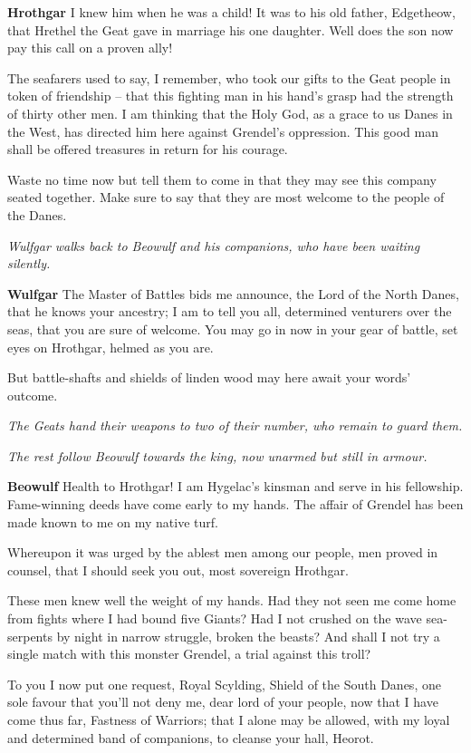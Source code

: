 \documentclass[a4paper]{article}
\begin{document}
{\textbf{Hrothgar} I knew him when he was a child!
It was to his old father, Edgetheow, that
Hrethel the Geat gave in marriage
his one daughter. Well does the son
now pay this call on a proven ally!

The seafarers used to say, I remember,
who took our gifts to the Geat people
in token of friendship – that this fighting man
in his hand’s grasp had the strength
of thirty other men. I am thinking that
the Holy God, as a grace to us
Danes in the West, has directed him here
against Grendel’s oppression. This good man shall be
offered treasures in return for his courage.

Waste no time now but tell them to come in
that they may see this company seated together.
Make sure to say that they are most welcome
to the people of the Danes.

\centerline{\textit{Wulfgar walks back to Beowulf and his companions, who have been waiting silently.}}

\textbf{Wulfgar} The Master of Battles bids me announce,
the Lord of the North Danes, that he knows your ancestry;
I am to tell you all, determined venturers
over the seas, that you are sure of welcome.
You may go in now in your gear of battle,
set eyes on Hrothgar, helmed as you are.

But battle-shafts and shields of linden wood
may here await your words' outcome.

\centerline{\textit{The Geats hand their weapons to two of their number, who remain to guard them.}}
\centerline{\textit{The rest follow Beowulf towards the king, now unarmed but still in armour.}}

\textbf{Beowulf} Health to Hrothgar! I am Hygelac’s kinsman
and serve in his fellowship. Fame-winning deeds
have come early to my hands. The affair of Grendel
has been made known to me on my native turf.

Whereupon it was urged by the ablest men
among our people, men proved in counsel,
that I should seek you out, most sovereign Hrothgar.

These men knew well the weight of my hands.
Had they not seen me come home from fights
where I had bound five Giants?
Had I not crushed on the wave
sea-serpents by night in narrow struggle,
broken the beasts? And shall I not try
a single match with this monster Grendel,
a trial against this troll?

To you I now
put one request, Royal Scylding,
Shield of the South Danes, one sole favour
that you’ll not deny me, dear lord of your people,
now that I have come thus far, Fastness of Warriors;
that I alone may be allowed, with my loyal and determined
band of companions, to cleanse your hall, Heorot.

}
\end{document}
